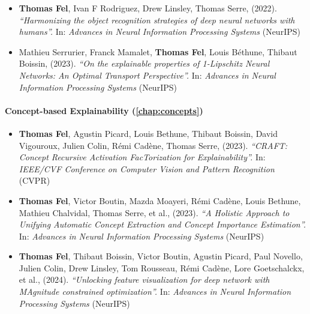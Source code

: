 \begin{itemize}

    \item \textbf{Thomas Fel}\equal, Ivan F Rodriguez\equal, Drew Linsley\equal, Thomas Serre, (2022). \textit{``Harmonizing the object recognition strategies of deep neural networks with humans''.} In: \textit{Advances in Neural Information Processing Systems}  (\textcolor{confcolor}{NeurIPS})

    \item Mathieu Serrurier, Franck Mamalet, \textbf{Thomas Fel}, Louis Béthune, Thibaut Boissin, (2023). \textit{``On the explainable properties of 1-Lipschitz Neural Networks: An Optimal Transport Perspective''.} In: \textit{Advances in Neural Information Processing Systems} (\textcolor{confcolor}{NeurIPS})

\end{itemize}


\paragraph{Concept-based Explainability (\autoref{chap:concepts})}

\begin{itemize}
    \item \textbf{Thomas Fel}\equal, Agustin Picard\equal, Louis Bethune\equal, Thibaut Boissin\equal, David Vigouroux, Julien Colin, Rémi Cadène, Thomas Serre, (2023). \textit{``CRAFT: Concept Recursive Activation FacTorization for Explainability''.} In: \textit{IEEE/CVF Conference on Computer Vision and Pattern Recognition} (\textcolor{confcolor}{CVPR})

    \item \textbf{Thomas Fel}\equal, Victor Boutin\equal, Mazda Moayeri, Rémi Cadène, Louis Bethune, Mathieu Chalvidal, Thomas Serre, et al., (2023). \textit{``A Holistic Approach to Unifying Automatic Concept Extraction and Concept Importance Estimation''.} In: \textit{Advances in Neural Information Processing Systems}  (\textcolor{confcolor}{NeurIPS})

    \item \textbf{Thomas Fel}\equal, Thibaut Boissin\equal, Victor Boutin\equal, Agustin Picard\equal, Paul Novello\equal, Julien Colin, Drew Linsley, Tom Rousseau, Rémi Cadène, Lore Goetschalckx, et al., (2024). \textit{``Unlocking feature visualization for deep network with MAgnitude constrained optimization''.} In: \textit{Advances in Neural Information Processing Systems}  (\textcolor{confcolor}{NeurIPS})
\end{itemize}

